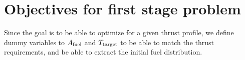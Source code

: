 \section{Objectives for first stage problem}

Since the goal is to be able to optimize for a given thrust profile,
we define dummy variables to $A_{\rm{fuel}}$ and $T_{\rm{target}}$
to be able to match the thrust requirements, and be able to extract the
initial fuel distribution.
